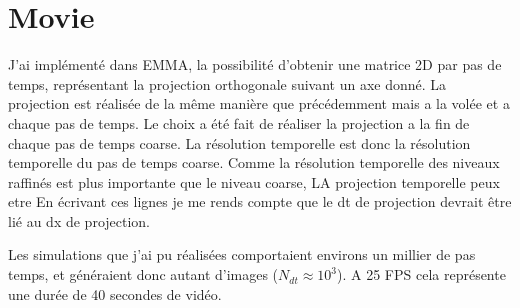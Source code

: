 %
%
%
%
%
%
%
%




\section{Movie}


J'ai implémenté dans EMMA, la possibilité d'obtenir une matrice 2D par pas de temps, représentant la projection orthogonale suivant un axe donné.
La projection est réalisée de la même manière que précédemment mais a la volée et a chaque pas de temps.
Le choix a été fait de réaliser la projection a la fin de chaque pas de temps coarse.
La résolution temporelle est donc la résolution temporelle du pas de temps coarse.
Comme la résolution temporelle des niveaux raffinés est plus importante que le niveau coarse, 
LA projection temporelle peux etre 
En écrivant ces lignes je me rends compte que le dt de projection devrait être lié au dx de projection. 

Les simulations que j'ai pu réalisées comportaient environs un millier de pas temps, et généraient donc autant d'images ($N_{dt} \approx 10^3$).
A 25 FPS cela représente une durée de 40 secondes de vidéo.




